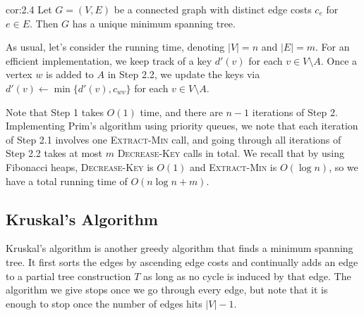 \begin{cor}{cor:2.4}
    Let $G = (V, E)$ be a connected graph with distinct edge costs $c_e$ for 
    $e \in E$. Then $G$ has a unique minimum spanning tree.
\end{cor}

As usual, let's consider the running time, denoting $|V| = n$ 
and $|E| = m$. For an efficient implementation, 
we keep track of a key $d'(v)$ for each $v \in V \setminus A$. 
Once a vertex $w$ is added to $A$ in Step 2.2, we update the keys via 
$d'(v) \gets \min\{d'(v), c_{wv}\}$ for each $v \in V \setminus A$. 

Note that Step 1 takes $O(1)$ time, and 
there are $n-1$ iterations of Step 2. Implementing Prim's algorithm 
using priority queues, we note that each iteration of Step 2.1 
involves one \textsc{Extract-Min} call, and 
going through all iterations of Step 2.2 takes at most $m$ 
\textsc{Decrease-Key} calls in total. We recall that by using Fibonacci heaps, 
\textsc{Decrease-Key} is $O(1)$ and \textsc{Extract-Min} is $O(\log n)$, 
so we have a total running time of $O(n\log n + m)$.

\subsection{Kruskal's Algorithm}\label{subsec:2.4}
Kruskal's algorithm is another greedy algorithm that finds a minimum 
spanning tree. It first sorts the edges by ascending edge costs 
and continually adds an edge to a partial tree construction $T$ as long as no 
cycle is induced by that edge. The algorithm we give stops once we 
go through every edge, but note that it is enough to stop once the 
number of edges hits $|V| - 1$.


